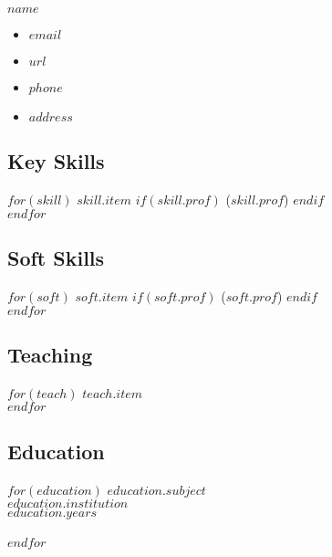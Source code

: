 \documentclass[$fontsize$, letter]{article}
\newcommand{\heading}[1]{
    \hrulefill \vspace{-0.5cm} \subsection*{{\color{gray} #1}}
}
\begin{document}
\begin{minipage}[t]{0.4\textwidth}
    {\Huge $name$}\\[.2cm]
\end{minipage}
\hfill
\begin{minipage}[b][2cm][b]{0.4\textwidth}
    \begin{itemize}[label={}, align=right]
        \item \hfill $email$
        \item \hfill \href{https://$url$}{$url$}
        \item \hfill $phone$
        \item \hfill $address$
    \end{itemize}
\end{minipage}


\begin{minipage}[t]{0.3\textwidth} %

\heading{Key Skills}
$for(skill)$
$skill.item$ $if(skill.prof)$ {\color{gray}($skill.prof$)} $endif$\\
$endfor$

\heading{Soft Skills}
$for(soft)$
$soft.item$ $if(soft.prof)$ {\color{gray}($soft.prof$)} $endif$\\
$endfor$

\heading{Teaching}
$for(teach)$
$teach.item$\\
$endfor$

\heading{Education}
$for(education)$
    $education.subject$\\
    {\small {\color{gray}
    $education.institution$\\
    $education.years$}}\\
    \\
$endfor$

\end{minipage}
\hfill
\end{document}

